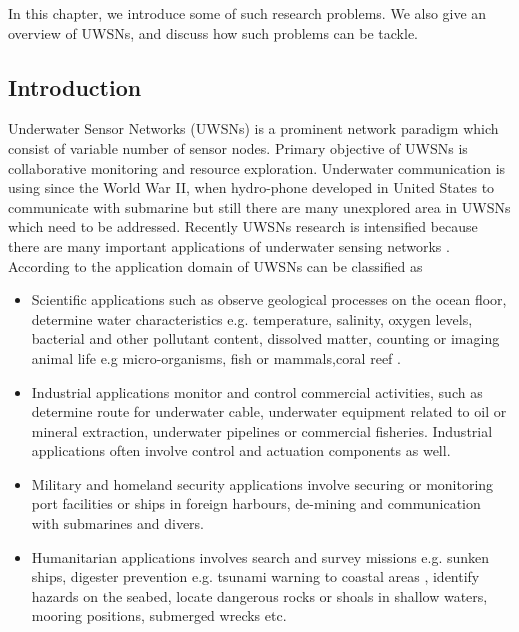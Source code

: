 \documentclass[12pt]{article}
\begin{document}
 In this chapter, we introduce some of such research problems. We also
give an overview of UWSNs, and discuss how such
problems can be tackle.
\subsection{Introduction}
Underwater Sensor Networks (UWSNs) is a prominent network paradigm which consist of variable number of sensor nodes. Primary objective of UWSNs is collaborative monitoring and resource exploration. Underwater communication is using since the World War II, when hydro-phone developed in United States to communicate with submarine \cite{quazi1982underwater} but still there are many unexplored area in UWSNs which need to be addressed.  Recently UWSNs research is intensified because there are many important applications of underwater sensing networks \cite{akyildiz2005underwater}  \cite{heidemann2012underwater} \cite{climent2014underwater}. According to \cite{heidemann2012underwater} the application domain of UWSNs can be classified as

\begin{itemize}[noitemsep]
\item Scientific applications such as observe geological processes on the ocean floor, determine water characteristics e.g. temperature, salinity, oxygen levels, bacterial and other pollutant content, dissolved matter, counting or imaging animal life e.g micro-organisms, fish or mammals,coral reef \cite{bromage2007sea}.

\item Industrial applications monitor and control commercial activities, such as determine route for underwater cable,
underwater equipment related to oil or mineral extraction, underwater pipelines or commercial fisheries. Industrial applications often involve control and actuation
components as well.

\item Military and homeland security applications involve securing or monitoring port facilities or ships in foreign harbours, de-mining and communication with submarines and divers.

\item Humanitarian applications involves search and survey missions e.g. sunken ships,  digester prevention e.g. tsunami warning to coastal areas \cite{cruz2008ocean}, identify hazards on the seabed, locate dangerous rocks or shoals in shallow waters, mooring positions, submerged wrecks etc.
\end{itemize} 
 
\end{document}
